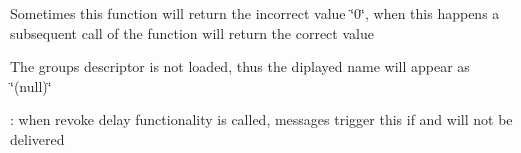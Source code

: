 
\begin{DoxyRefList}
\item[Global \mbox{\hyperlink{thread__synch_8h_af047c2dd764df71c248cb161f1d1cec4}{get\+Current\+Storage\+Size}} (thread\+\_\+group\+\_\+t $\ast$group)]\label{bug__bug000003}%
%
Sometimes this function will return the incorrect value \char`\"{}0\char`\"{}, when this happens a subsequent call of the function will return the correct value 
\item[Global \mbox{\hyperlink{thread__synch_8h_a785bcde5f08439e91a2c6828bbf5d83d}{load\+Group\+From\+ID}} (const int group\+\_\+id)]\label{bug__bug000004}%
%
The group\textquotesingle{}s descriptor is not loaded, thus the diplayed name will appear as \char`\"{}(null)\char`\"{} 
\item[Global \mbox{\hyperlink{message_8h_af0eb4f46db2a45d736b02c2ac731fdba}{read\+Message}} (msg\+\_\+t $\ast$dest\+\_\+buffer, msg\+\_\+manager\+\_\+t $\ast$manager)]\label{bug__bug000002}%
%
\+: when \textquotesingle{}revoke delay\textquotesingle{} functionality is called, messages trigger this if and will not be delivered 
\end{DoxyRefList}